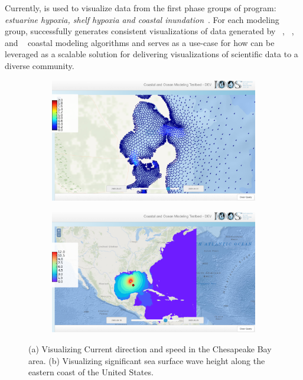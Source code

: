 Currently, \Sciwms{} is used to visualize data from the first phase
groups of \ioos{} \comt{} program: {\em estuarine hypoxia, shelf
  hypoxia and coastal inundation}~\cite{luettich13}. For each modeling
group, \sciwms{} successfully generates consistent visualizations of
data generated by \adcirc{}~\cite{adcirc}, \fvcom{}~\cite{chen06},
\selfe{}~\cite{zhang08} and \slosh{}~\cite{chen84} coastal modeling
algorithms and serves as a use-case for how \sciwms{} can be leveraged
as a scalable solution for delivering visualizations of
scientific data to a diverse community.

\newif\ifpltsub
\pltsubtrue%
\ifpltsub
\begin{figure}[ht!]
  \centering
  \begin{subfigure}[t]{0.49\columnwidth}
    \centering
    \includegraphics[width=\columnwidth]{../figs/vims_selfe_ubaratropic_vbaratropic_chesapeake_bay_crop_695_0_2125_1265}
    \caption{}
    \label{fig:vims_selfe_chesapeake}
  \end{subfigure}
  \begin{subfigure}[t]{0.49\columnwidth}
    \centering
    \includegraphics[width=\columnwidth]{../figs/inundation_tropical_VIMS_SELFE_hurricane_rita_2d_final_run_with_waves_sea_surface_wave_significant_height_crop_695_0_2125_1265}
    \caption{}
    \label{fig:vims_selfe_ssh}
  \end{subfigure}
  \caption{(a) Visualizing Current direction and speed in the
    Chesapeake Bay area. (b) Visualizing significant sea surface wave
    height along the eastern coast of the United States.}
\end{figure}
